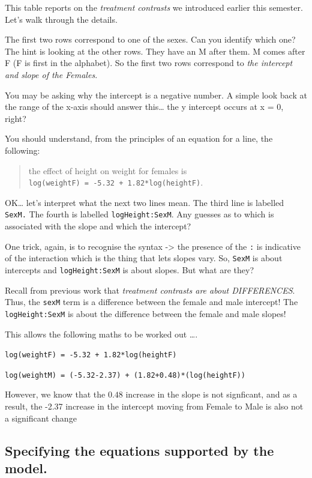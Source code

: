 \documentclass[
]{book}
\begin{document}
This table reports on the \emph{treatment contrasts} we introduced earlier this semester. Let's walk through the details.

The first two rows correspond to one of the sexes. Can you identify which one? The hint is looking at the other rows. They have an M after them. M comes after F (F is first in the alphabet). So the first two rows correspond to \emph{the intercept and slope of the Females}.

You may be asking why the intercept is a negative number. A simple look back at the range of the x-axis should answer this\ldots{} the y intercept occurs at x = 0, right?

You should understand, from the principles of an equation for a line, the following:

\begin{quote}
the effect of height on weight for females is \texttt{log(weightF)\ =\ -5.32\ +\ 1.82*log(heightF)}.
\end{quote}

OK\ldots{} let's interpret what the next two lines mean. The third line is labelled \texttt{SexM.} The fourth is labelled \texttt{logHeight:SexM}. Any guesses as to which is associated with the slope and which the intercept?

One trick, again, is to recognise the syntax -\textgreater{} the presence of the \texttt{:} is indicative of the interaction which is the thing that lets slopes vary. So, \texttt{SexM} is about intercepts and \texttt{logHeight:SexM} is about slopes. But what are they?

Recall from previous work that \emph{treatment contrasts are about DIFFERENCES}. Thus, the \texttt{sexM} term is a difference between the female and male intercept! The \texttt{logHeight:SexM} is about the difference between the female and male slopes!

This allows the following maths to be worked out \ldots.

\texttt{log(weightF)\ =\ -5.32\ +\ 1.82*log(heightF)}

\texttt{log(weightM)\ =\ (-5.32-2.37)\ +\ (1.82+0.48)*(log(heightF))}

However, we know that the \(0.48\) increase in the slope is not signficant, and as a result, the -2.37 increase in the intercept moving from Female to Male is also not a significant change

\hypertarget{specifying-the-equations-supported-by-the-model.}{%
\subsection{Specifying the equations supported by the model.}\label{specifying-the-equations-supported-by-the-model.}}
\end{document}
